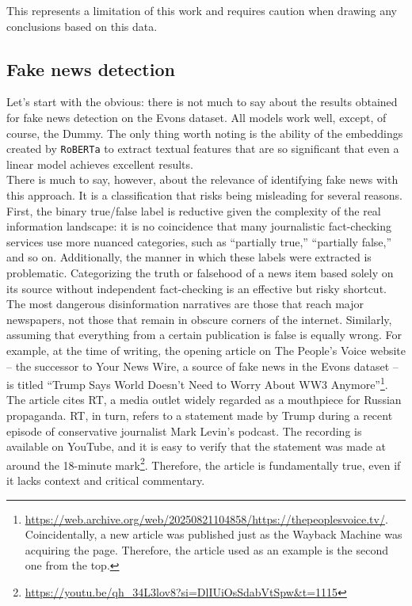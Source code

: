 \documentclass[a4paper,twoside,12pt]{book}
\begin{document}
This represents a limitation of this work and requires caution when drawing any conclusions based on this data.

\subsection{Fake news detection}
Let's start with the obvious: there is not much to say about the results obtained for fake news detection on the Evons dataset. All models work well, except, of course, the Dummy. The only thing worth noting is the ability of the embeddings created by \texttt{RoBERTa} to extract textual features that are so significant that even a linear model achieves excellent results. \\
There is much to say, however, about the relevance of identifying fake news with this approach. It is a classification that risks being misleading for several reasons. First, the binary true/false label is reductive given the complexity of the real information landscape: it is no coincidence that many journalistic fact-checking services use more nuanced categories, such as “partially true,” “partially false,” and so on. Additionally, the manner in which these labels were extracted is problematic. Categorizing the truth or falsehood of a news item based solely on its source without independent fact-checking is an effective but risky shortcut. The most dangerous disinformation narratives are those that reach major newspapers, not those that remain in obscure corners of the internet. Similarly, assuming that everything from a certain publication is false is equally wrong. For example, at the time of writing, the opening article on The People's Voice website -- the successor to Your News Wire, a source of fake news in the Evons dataset -- is titled \enquote{Trump Says World Doesn't Need to Worry About WW3 Anymore}\footnote{\url{https://web.archive.org/web/20250821104858/https://thepeoplesvoice.tv/}. Coincidentally, a new article was published just as the Wayback Machine was acquiring the page. Therefore, the article used as an example is the second one from the top.}. The article cites RT, a media outlet widely regarded as a mouthpiece for Russian propaganda. RT, in turn, refers to a statement made by Trump during a recent episode of conservative journalist Mark Levin's podcast. The recording is available on YouTube, and it is easy to verify that the statement was made at around the 18-minute mark\footnote{\url{https://youtu.be/qh_34L3lov8?si=DlIUiOsSdabVtSpw&t=1115}}. Therefore, the article is fundamentally true, even if it lacks context and critical commentary.\\
\end{document}
